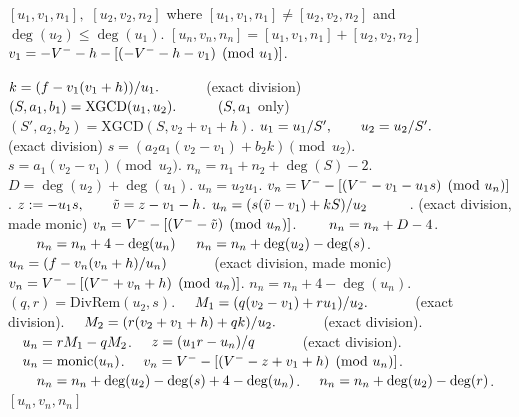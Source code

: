     
\begin{algorithm}[htbp]
\caption{Genus 3 Split Model Addition (Negative Reduced Balanced NUCOMP)}
\label{alg:g3balnucomp}
\begin{algorithmic}[1]
\Require $[u_1,v_1,n_1],$ $[u_2,v_2,n_2]$ where $[u_1,v_1,n_1] \neq [u_2,v_2,n_2]$ and $\deg(u_2) \leq \deg(u_1)$.
\Ensure $[u_n,v_n,n_n] = [u_1,v_1,n_1] + [u_2,v_2,n_2]$
    \State $v_1 = -V^{-} - h - [(-V^{-} - h - v_1) \pmod{u_1}]$.
\EndIf

\State $k = (f - v_1(v_1 + h))/u_1. \quad\quad\quad$ (exact division)
\State $(S,a_1,b_1) = \mathrm{XGCD}(u_1,u_2). \quad\quad\quad  (S, a_1$ only)
\State $(S',a_2,b_2) = \mathrm{XGCD}(S,v_2 + v_1 + h)$.
        \State $u_1 = u_1/S', \quad\quad u_2 = u_2/S'. \quad\quad\quad$ (exact division)
    \EndIf
    \State $s = (a_2a_1(v_2 - v_1) + b_2k) \pmod{u_2}$.
\Else
    \State $s = a_1(v_2 - v_1) \pmod{u_2}$.
\EndIf
\State $n_n = n_1 + n_2 + \deg(S) - 2$.
\State $D = \deg(u_2) + \deg(u_1)$.
    \State $u_n = u_2u_1$.
    \State $v_n = V^{-} - [(V^{-} - v_1 - u_1s) \pmod{u_n}]$.
    \State $z := -u_1s, \quad\quad \tilde{v} = z - v_1 - h$.
    \State $u_n = (s(\tilde{v} - v_1) + kS)/u_2 \quad\quad\quad$. (exact division, made monic)
    \State $v_n = V^{-} - [(V^{-} - \tilde{v}) \pmod{u_n}]$.
     $\quad\quad n_n = n_n + D - 4$.
    \Else
         $\quad\quad n_n = n_n + 4 - \deg(u_n)$ 
        \Else \hspace{75pt} $\quad n_n = n_n + \deg(u_2) - \deg(s)$.
        \EndIf
            \State $u_n = (f - v_n(v_n + h)/u_n) \quad\quad\quad$ (exact division, made monic)
            \State $v_n = V^{-} - [(V^{-} + v_n + h) \pmod{u_n}]$.
            \State $n_n = n_n + 4 - \deg(u_n)$.
        \EndIf
    \EndIf
\Else\hspace{2pt} 
    \State $(q,r) = \mathrm{DivRem}(u_2,s)$.
    \State $\quad M_1 = (q(v_2 - v_1) + ru_1)/u_2. \quad\quad\quad$ (exact division).
    \State $\quad M_2 = (r(v_2 + v_1 + h) + qk)/u_2. \quad\quad\quad$ (exact division).
    \State $\quad u_n = rM_1 - qM_2$.
    \State $\quad z = (u_1r - u_n)/q \quad\quad\quad$ (exact division).
    \State $\quad u_n = \mathrm{monic}(u_n)$.
    \State $\quad v_n = V^{-} - [(V^{-} - z + v_1 + h) \pmod{u_n}]$.
     $\quad\quad n_n = n_n + \deg(u_2) - \deg(s) + 4 - \deg(u_n)$.
    \Else \hspace{74pt} $\quad n_n = n_n + \deg(u_2) - \deg(r)$.
    \EndIf
\EndIf
\State \Return $[u_n,v_n,n_n]$
\end{algorithmic}
\end{algorithm}

